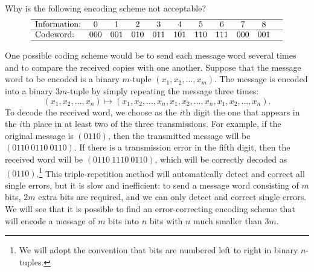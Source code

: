 \begin{exercise}{}
Why is the following encoding scheme not acceptable?
\[
\begin{array}{lcccccccccc}
\hline
\mbox{Information:} & 0 & 1 & 2 & 3 & 4 & 5 & 6 & 7 & 8 &
\\ \hline
\mbox{Codeword:} & 000 & 001 & 010 & 011 & 101 & 110
& 111 & 000 & 001 \\ \hline
\end{array}
\]
 \end{exercise} 
 
\begin{example}{}
One possible coding scheme would be to send each message word several
times and to compare the received copies with one another. Suppose
that the message word to be encoded is a binary $m$-tuple $(x_{1}, x_{2},
\ldots, x_{m})$. The message is encoded into a binary $3m$-tuple by
simply repeating the message three times: 
\[
(x_{1}, x_{2}, \ldots, x_{n})
\mapsto
(x_{1}, x_{2}, \ldots, x_{n}, x_{1}, x_{2}, \ldots, x_{n},
x_{1}, x_{2}, \ldots, x_{n}).
\]
To decode the received word, we choose as the $i$th digit the one that
appears in the $i$th place in at least two of the three transmissions.
For example, if the original message is $(0110)$, then the transmitted
message will be \mbox{$(0110\:0110\:0110)$}. If there is a transmission error
in the fifth digit, then the received word will be
$(0110\:1110\:0110)$, which will be correctly decoded as
$(0110)$.\footnote{We will adopt the convention that bits are numbered
left to right in binary $n$-tuples.} 
This triple-repetition method will automatically detect and correct
all single errors, but it is slow and inefficient: to send a message word
consisting of $m$ bits, $2m$ extra bits are required, and we can only
detect and correct single errors. We will see that it is possible to
find an error-correcting encoding scheme that will encode a message of $m$ bits into
$n$ bits with $n$ much smaller than $3m$.
\end{example}

